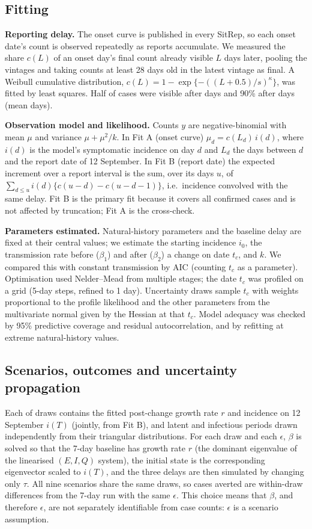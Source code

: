 \documentclass[11pt,a4paper]{article}
\begin{document}
\subsection{Fitting}
\textbf{Reporting delay.} The onset curve is published in every SitRep, so each onset date's count is observed repeatedly as reports accumulate. We measured the share $c(L)$ of an onset day's final count already visible $L$ days later, pooling the \nVintages{} vintages and taking counts at least 28 days old in the latest vintage as final. A Weibull cumulative distribution, $c(L)=1-\exp\{-((L+0.5)/s)^{\kappa}\}$, was fitted by least squares. Half of cases were visible after \delayHalf{} days and 90\% after \delayNinety{} days (mean \delayMean{} days).

\textbf{Observation model and likelihood.} Counts $y$ are negative-binomial with mean $\mu$ and variance $\mu+\mu^2/k$. In Fit A (onset curve) $\mu_d=c(L_d)\,i(d)$, where $i(d)$ is the model's symptomatic incidence on day $d$ and $L_d$ the days between $d$ and the report date of 12 September. In Fit B (report date) the expected increment over a report interval is the sum, over its days $u$, of $\sum_{d\le u} i(d)\{c(u-d)-c(u-d-1)\}$, i.e.\ incidence convolved with the same delay. Fit B is the primary fit because it covers all confirmed cases and is not affected by truncation; Fit A is the cross-check.

\textbf{Parameters estimated.} Natural-history parameters and the baseline delay are fixed at their central values; we estimate the starting incidence $i_0$, the transmission rate before ($\beta_1$) and after ($\beta_2$) a change on date $t_c$, and $k$. We compared this with constant transmission by AIC (counting $t_c$ as a parameter). Optimisation used Nelder--Mead from multiple stages; the date $t_c$ was profiled on a grid (5-day steps, refined to 1 day). Uncertainty draws sample $t_c$ with weights proportional to the profile likelihood and the other parameters from the multivariate normal given by the Hessian at that $t_c$. Model adequacy was checked by 95\% predictive coverage and residual autocorrelation, and by refitting at extreme natural-history values.

\subsection{Scenarios, outcomes and uncertainty propagation}
Each of \nDraws{} draws contains the fitted post-change growth rate $r$ and incidence on 12 September $i(T)$ (jointly, from Fit B), and latent and infectious periods drawn independently from their triangular distributions. For each draw and each $\epsilon$, $\beta$ is solved so that the 7-day baseline has growth rate $r$ (the dominant eigenvalue of the linearised $(E,I,Q)$ system), the initial state is the corresponding eigenvector scaled to $i(T)$, and the three delays are then simulated by changing only $\tau$. All nine scenarios share the same draws, so cases averted are within-draw differences from the 7-day run with the same $\epsilon$. This choice means that $\beta$, and therefore $\epsilon$, are not separately identifiable from case counts: $\epsilon$ is a scenario assumption.
\end{document}
